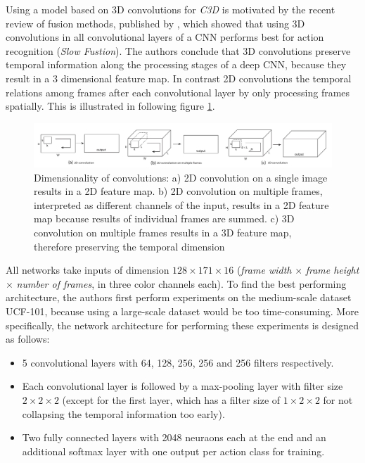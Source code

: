 Using a model based on 3D convolutions for \textit{C3D} is motivated by the recent review of fusion methods, published by \textcite{karpathy_large-scale_2014}, which showed that using 3D convolutions in all convolutional layers of a CNN performs best for action recognition (\textit{Slow Fustion}).  
The authors conclude that 3D convolutions preserve temporal information along the processing stages of a deep CNN, because they result in a 3 dimensional feature map.
In contrast 2D convolutions the temporal relations among frames after each convolutional layer by only processing frames spatially.
This is illustrated in following figure \ref{fig:c3d_2dconv3dconv}.
\begin{figure}[H]
    \centering
    \includegraphics[width=\textwidth]{img_deep/c3d_2dconv3dconv}
\caption{Dimensionality of convolutions: a) 2D convolution on a single image results in a 2D feature map. b) 2D convolution on multiple frames, interpreted as different channels of the input, results in a 2D feature map because results of individual frames are summed. c) 3D convolution on multiple frames results in a 3D feature map, therefore preserving the temporal dimension \cite{karpathy_large-scale_2014}}
    \label{fig:c3d_2dconv3dconv}
\end{figure}

All networks take inputs of dimension $128\times171\times16$ (\textit{frame width} $\times$ \textit{frame height} $\times$ \textit{number of frames}, in three color channels each).
To find the best performing architecture, the authors first perform experiments on the medium-scale dataset UCF-101\cite{soomro_ucf101:_2012}, because using a large-scale dataset would be too time-consuming.
More specifically, the network architecture for performing these experiments is designed as follows:
\begin{itemize}
    \item 5 convolutional layers with 64, 128, 256, 256 and 256 filters respectively.
    \item Each convolutional layer is followed by a max-pooling layer with filter size $2\times2\times2$ (except for the first layer, which has a filter size of $1\times2\times2$ for not collapsing the temporal information too early).
    \item Two fully connected layers with 2048 neuraons each at the end and an additional softmax layer with one output per action class for training.
\end{itemize}

